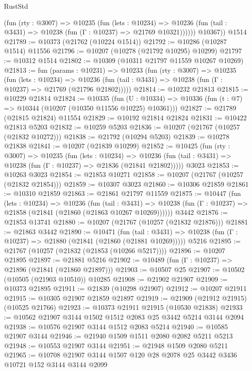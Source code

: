 \begin{lexlean}{RustStd}
\begin{coremodule}
            (fun (rty : @3007) =>
            @10235
              (fun (lets : @10234) =>
              @10236 (fun (tail : @3431) => @10238 (fun (Γ : @10237) => @21769 @10321))))))
        @10367))
    @1514
@21789 := @10373 (@21762 (@10224 @1514))
@21792 := @10286 (@10287 @1514) @11556
@21796 := @10207 (@10278 (@21792 @10295) @10299)
@21797 := @10312 @1514
@21802 := @10309 (@10311 @21797 @11559 @10267 @10269)
@21813 := fun (params : @10231) =>
  @10233
    (fun (rty : @3007) =>
    @10235
      (fun (lets : @10234) =>
      @10236 (fun (tail : @3431) => @10238 (fun (Γ : @10237) => @21769 (@21796 @21802)))))
@21814 := @10232 @21813
@21815 := @10229 @21814
@21824 := @10335
    (fun (U : @10334) => @10336 (fun (t : @7) => @10344 (@10207 (@10350 @11556 @10225) @10361)))
@21827 := @21789 (@21815 @21824) @11554
@21829 := @10192 @21814 @21824
@21831 := @10422 @21813 @5203
@21832 := @10259 @5203
@21836 := @10207 (@21767 (@10257 (@21832 @10272)))
@21838 := @21792 (@10294 @5203)
@21839 := @10278 @21838
@21841 := @10207 (@21839 @10299)
@21852 := @10425
    (fun (rty : @3007) =>
    @10235
      (fun (lets : @10234) =>
      @10236 (fun (tail : @3431) => @10238 (fun (Γ : @10237) => @21836 (@21841 @21802)))))
    @3023
@21853 := @10263 @3023
@21854 := @21853 @10271
@21858 := @10207 (@21767 (@10257 (@21832 @21854)))
@21859 := @10307 @3023
@21860 := @10306 @21859
@21861 := @10310 @21859
@21863 := @21861 @21797 @11559
@21875 := @10447
    (fun (lets : @10234) =>
    @10236
      (fun (tail : @3431) =>
      @10238 (fun (Γ : @10237) => @21858 (@21841 (@21860 (@21863 @10267 @10269))))))
    @3442
@21876 := @21853 @13741
@21880 := @10207 (@21767 (@10257 (@21832 @21876)))
@21881 := @21863 @3442
@21890 := @10471
    (fun (tail : @3431) => @10238 (fun (Γ : @10237) => @21880 (@21841 (@21860 (@21881 @10269)))))
    @5216
@21895 := @21767 (@10257 (@21832 (@21853 (@10266 @5217))))
@21896 := @10207 @21895
@21897 := @21881 @5216
@21902 := @10489 (fun (Γ : @10237) => @21896 (@21841 (@21860 @21897)))
@21903 := @10507 @25
@21907 := @10502 (@10505 (@21903 @10510)) @10285
@21908 := @21902 @21907
@21909 := @10373 @21895
@21911 := @21839 (@10298 @21907)
@21912 := @10207 @21911
@21915 := @10305 @21907 @21859 @21897
@21919 := @21909 (@21912 @21915) (@10525 @21766)
@21923 := @10373 @21911 @21915 (@10530 @21838)
@21933 := @10562 @21907 @3144 @1502 @1512 @2083 @25 @3442 @5214 @3144 @2094
@21938 := @10576 @21907 @3144 @1512 @2083 @5214
@21940 := @10585 @21907 @3144
@21946 := @21940 @1509 @1511 @2080 @2082 @5211 @5213
@21948 := @10553 @21907 @3144
@21951 := @21948 @1509 @2080 @5211
@21965 := @10708 @21907 @3144 @1507 @120 @28 @2078 @25 @3442 @3436 @10721 @152 @3144 @3144 @2099

\end{coremodule}
\end{lexlean}
